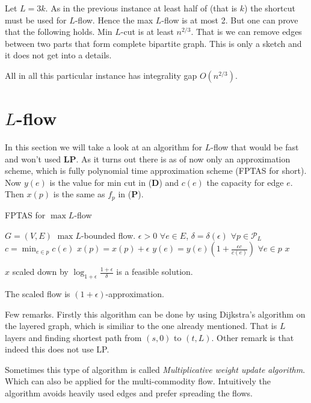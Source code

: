 Let $L = 3k$. As in the previous instance at least half of (that is $k$) the shortcut must be used for $L$-flow. Hence the max $L$-flow is at most 2. But one can prove that the following holds. Min $L$-cut is at least $n^{2/3}$. That is we can remove edges between two parts that form complete bipartite graph. This is only a sketch and it does not get into a details.

All in all this particular instance has integrality gap $O(n^{2/3})$.

\section{$L$-flow}

In this section we will take a look at an algorithm for $L$-flow that would be fast and won't used \textbf{LP}. As it turns out there is as of now only an approximation scheme, which is fully polynomial time approximation scheme (FPTAS for short). Now $y(e)$ is the value for min cut in (\textbf{D}) and $c(e)$ the capacity for edge $e$. Then $x(p)$ is the same as $f_p$ in (\textbf{P}).

\begin{algorithm}
	\caption{FPTAS for $\max L$-flow}
	\begin{algorithmic}[1]
		\Require $G = (V,E)$
		\Ensure $\max L$-bounded flow.
		\State $\epsilon > 0$ $\forall e \in E$, $\delta = \delta(\epsilon)$ $\forall p \in \mathcal{P}_L$
			\State $c = \min_{e \in p} c(e)$
			\State $x(p) = x(p) + \epsilon$
			\State $y(e) = y(e) \left( 1 + \frac{\epsilon c}{c(e)} \right)$ $\forall e \in p$
		\EndWhile
		\State \Return $x$
	\end{algorithmic}
\end{algorithm}

\begin{lemma}
	$x$ scaled down by $\log_{1 + \epsilon} \frac{1+\epsilon}{\delta}$ is a feasible solution.
\end{lemma}

\begin{thm}
	The scaled flow is $(1 + \epsilon)$-approximation.
\end{thm}

Few remarks. Firstly this algorithm can be done by using Dijkstra's algorithm on the layered graph, which is similiar to the one already mentioned. That is $L$ layers and finding shortest path from $(s,0)$ to $(t, L)$. Other remark is that indeed this does not use LP.

Sometimes this type of algorithm is called \textit{Multiplicative weight update algorithm}. Which can also be applied for the multi-commodity flow. Intuitively the algorithm avoids heavily used edges and prefer spreading the flows.
